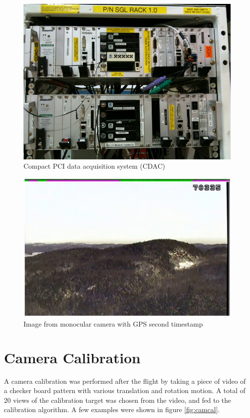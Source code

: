 \begin{figure}[h]
  \centering
  \includegraphics[width=12cm,keepaspectratio=true]{./Figures/CDAC_Rack.jpg}
  \caption{Compact PCI data acquisition system (CDAC)}
  \label{fig:CDAC}
\end{figure}

\begin{figure}[h]
  \centering
  \includegraphics[width=12cm,keepaspectratio=true]{./Figures/video_snapshot.jpg}
  \caption{Image from monocular camera with GPS second timestamp}
  \label{fig:video_snapshot}
\end{figure}

\FloatBarrier

\section{Camera Calibration}\label{sec:camcal}

A camera calibration was performed after the flight by taking a piece
of video of a checker board pattern with various translation and
rotation motion. A total of 20 views of the calibration target was
chosen from the video, and fed to the calibration algorithm. A few
examples were shown in figure \ref{fig:camcal}.

